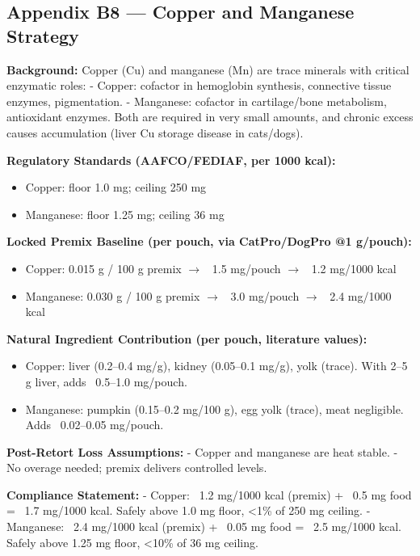 \subsection*{Appendix B8 --- Copper and Manganese Strategy\cite{ref6}}

\textbf{Background:}  
Copper (Cu) and manganese (Mn) are trace minerals with critical enzymatic roles:  
- Copper: cofactor in hemoglobin synthesis, connective tissue enzymes, pigmentation.  
- Manganese: cofactor in cartilage/bone metabolism, antioxidant enzymes.  
Both are required in very small amounts, and chronic excess causes accumulation (liver Cu storage disease in cats/dogs).

\textbf{Regulatory Standards (AAFCO/FEDIAF, per 1000 kcal):}  
\begin{itemize}[leftmargin=1.2em]
  \item Copper: floor 1.0 mg; ceiling 250 mg  
  \item Manganese: floor 1.25 mg; ceiling 36 mg  
\end{itemize}

\textbf{Locked Premix Baseline (per pouch, via CatPro/DogPro @1 g/pouch):}  
\begin{itemize}[leftmargin=1.2em]
  \item Copper: 0.015 g / 100 g premix $\rightarrow$ ~1.5 mg/pouch $\rightarrow$ ~1.2 mg/1000 kcal  
  \item Manganese: 0.030 g / 100 g premix $\rightarrow$ ~3.0 mg/pouch $\rightarrow$ ~2.4 mg/1000 kcal  
\end{itemize}

\textbf{Natural Ingredient Contribution (per pouch, literature values):}  
\begin{itemize}[leftmargin=1.2em]
  \item Copper: liver (0.2--0.4 mg/g), kidney (0.05--0.1 mg/g), yolk (trace). With 2--5 g liver, adds ~0.5--1.0 mg/pouch.  
  \item Manganese: pumpkin (0.15--0.2 mg/100 g), egg yolk (trace), meat negligible. Adds ~0.02--0.05 mg/pouch.  
\end{itemize}

\textbf{Post-Retort Loss Assumptions:}  
- Copper and manganese are heat stable.  
- No overage needed; premix delivers controlled levels.

\textbf{Compliance Statement:}  
- Copper: ~1.2 mg/1000 kcal (premix) + ~0.5 mg food = ~1.7 mg/1000 kcal. Safely above 1.0 mg floor, <1\% of 250 mg ceiling.  
- Manganese: ~2.4 mg/1000 kcal (premix) + ~0.05 mg food = ~2.5 mg/1000 kcal. Safely above 1.25 mg floor, <10\% of 36 mg ceiling.

